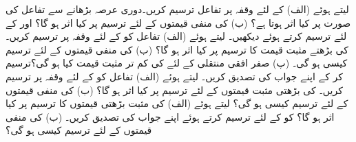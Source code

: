  \quad
{} لیتے ہوئے (الف)  کے لئے وقفہ  پر تفاعل ترسیم کریں۔دوری عرصہ بڑھانے سے تفاعل کی صورت پر کیا اثر ہوتا ہے؟  (ب)   کی منفی قیمتوں کے لئے ترسیم پر کیا اثر ہو گا؟  اور  کے لئے ترسیم کرتے ہوئے دیکھیں۔
\quad
{} لیتے ہوئے (الف) تفاعل  کو  کے لئے وقفہ  پر ترسیم کریں۔  کی بڑھتے مثبت قیمت کا ترسیم پر کیا اثر ہو گا؟  (ب)  کی منفی قیمتوں کے لئے ترسیم کیسی ہو گی۔ (پ)  صفر افقی منتقلی کے لئے  کی کم تر مثبت قیمت کیا ہو گی؟ترسیم کر کے اپنے جواب کی تصدیق کریں۔
\quad
{} لیتے ہوئے (الف) تفاعل  کو  کے لئے وقفہ  پر ترسیم کریں۔ کی بڑھتی مثبت قیمتوں کے لئے ترسیم پر کیا اثر ہو گا؟ (ب)  کی منفی قیمتوں کے لئے ترسیم کیسی ہو گی؟
\quad
{} لیتے ہوئے (الف)  کی مثبت بڑھتی قیمتوں کا ترسیم پر کیا اثر ہو گا؟  کو  کے لئے ترسیم کرتے ہوئے اپنے جواب کی تصدیق کریں۔ (ب)  کی منفی قیمتوں کے لئے ترسیم کیسی ہو گی؟ 
